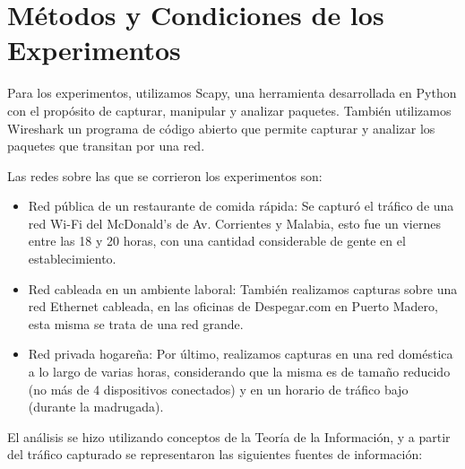 \section{Métodos y Condiciones de los Experimentos}

Para los experimentos, utilizamos Scapy, una herramienta desarrollada en Python con el propósito de capturar, manipular y analizar paquetes. También utilizamos Wireshark un programa de código abierto que permite capturar y analizar los paquetes que transitan por una red.

Las redes sobre las que se corrieron los experimentos son:

\begin{itemize}

  \item Red pública de un restaurante de comida rápida: Se capturó el tráfico de una red Wi-Fi del McDonald's de Av. Corrientes y Malabia, esto fue un viernes entre las 18 y 20 horas, con una cantidad considerable de gente en el establecimiento.
  
  \item Red cableada en un ambiente laboral: También realizamos capturas sobre una red Ethernet cableada, en las oficinas de Despegar.com en Puerto Madero, esta misma se trata de una red grande.
  
  \item Red privada hogareña: Por último, realizamos capturas en una red doméstica a lo largo de varias horas, considerando que la misma es de tamaño reducido (no más de 4 dispositivos conectados) y en un horario de tráfico bajo (durante la madrugada).

\end{itemize}

El análisis se hizo utilizando conceptos de la Teoría de la Información, y a partir del tráfico capturado se representaron las siguientes fuentes de información:

